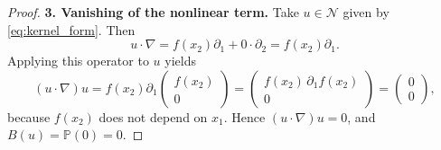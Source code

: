 \documentclass[11pt,a4paper,reqno]{amsart}
\theoremstyle{definition}
\newcommand{\N}{\mathcal{N}}
\begin{document}
\begin{proof}
  \textbf{3.  Vanishing of the nonlinear term.}\;
  Take $u\in\N$ given by \eqref{eq:kernel_form}.  Then
  \[
    u\cdot\nabla = f(x_2)\partial_1 + 0\cdot\partial_2 = f(x_2)\partial_1 .
  \]
  Applying this operator to $u$ yields
  \[
    (u\cdot\nabla)u = f(x_2)\partial_1 \begin{pmatrix} f(x_2) \\ 0 \end{pmatrix}
    = \begin{pmatrix} f(x_2)\,\partial_1 f(x_2) \\ 0 \end{pmatrix}
    = \begin{pmatrix} 0 \\ 0 \end{pmatrix},
  \]
  because $f(x_2)$ does not depend on $x_1$.  Hence $(u\cdot\nabla)u = 0$, and
  $B(u) = \mathbb{P}(0) = 0$.
\end{proof}
\end{document}
